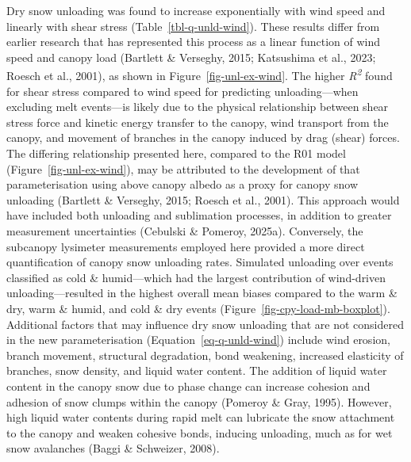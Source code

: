 \documentclass[
  letterpaper,
]{tex/uofsthesis-cs}
\begin{document}
Dry snow unloading was found to increase exponentially with wind speed
and linearly with shear stress (Table~\ref{tbl-q-unld-wind}). These
results differ from earlier research that has represented this process
as a linear function of wind speed and canopy load (Bartlett \&
Verseghy, 2015; Katsushima et al., 2023; Roesch et al., 2001), as shown
in Figure~\ref{fig-unl-ex-wind}. The higher \emph{R\textsuperscript{2}}
found for shear stress compared to wind speed for predicting
unloading---when excluding melt events---is likely due to the physical
relationship between shear stress force and kinetic energy transfer to
the canopy, wind transport from the canopy, and movement of branches in
the canopy induced by drag (shear) forces. The differing relationship
presented here, compared to the R01 model
(Figure~\ref{fig-unl-ex-wind}), may be attributed to the development of
that parameterisation using above canopy albedo as a proxy for canopy
snow unloading (Bartlett \& Verseghy, 2015; Roesch et al., 2001). This
approach would have included both unloading and sublimation processes,
in addition to greater measurement uncertainties (Cebulski \& Pomeroy,
2025a). Conversely, the subcanopy lysimeter measurements employed here
provided a more direct quantification of canopy snow unloading rates.
Simulated unloading over events classified as cold \& humid---which had
the largest contribution of wind-driven unloading---resulted in the
highest overall mean biases compared to the warm \& dry, warm \& humid,
and cold \& dry events (Figure~\ref{fig-cpy-load-mb-boxplot}).
Additional factors that may influence dry snow unloading that are not
considered in the new parameterisation (Equation~\ref{eq-q-unld-wind})
include wind erosion, branch movement, structural degradation, bond
weakening, increased elasticity of branches, snow density, and liquid
water content. The addition of liquid water content in the canopy snow
due to phase change can increase cohesion and adhesion of snow clumps
within the canopy (Pomeroy \& Gray, 1995). However, high liquid water
contents during rapid melt can lubricate the snow attachment to the
canopy and weaken cohesive bonds, inducing unloading, much as for wet
snow avalanches (Baggi \& Schweizer, 2008).
\end{document}
